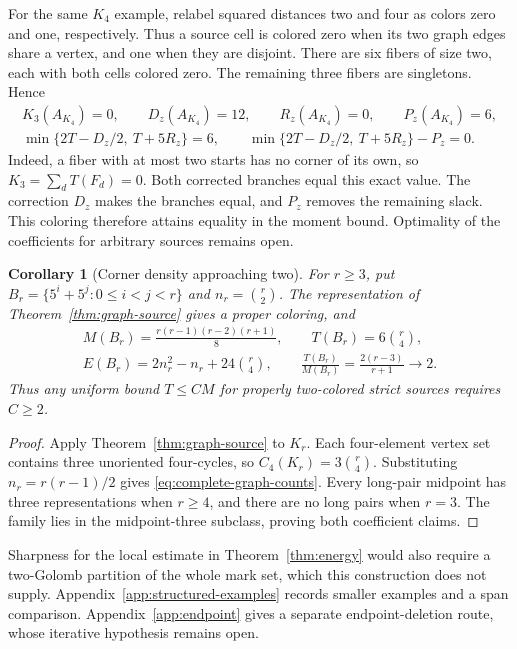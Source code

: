 \documentclass[11pt,a4paper]{article}
\newif\ifshowrevisions
\newenvironment{revision}{\par\begingroup\ifshowrevisions\color{red}\fi}{\par\endgroup}
\newtheorem{corollary}[theorem]{Corollary}
\theoremstyle{definition}
\numberwithin{equation}{section}
\begin{document}
\begin{revision}
For the same $K_4$ example, relabel squared distances two and four as
colors zero and one, respectively. Thus a source cell is colored zero
when its two graph edges share a vertex, and one when they are disjoint.
There are six fibers of size two, each with both cells colored zero.
The remaining three fibers are singletons. Hence
\begin{equation}\label{eq:k4-moment-sharpness}
\begin{gathered}
K_3(A_{K_4})=0,\qquad D_z(A_{K_4})=12,\qquad
R_z(A_{K_4})=0,\qquad P_z(A_{K_4})=6,\\
\min\{2T-D_z/2,\ T+5R_z\}=6,\qquad
\min\{2T-D_z/2,\ T+5R_z\}-P_z=0.
\end{gathered}
\end{equation}
Indeed, a fiber with at most two starts has no corner of its own, so
$K_3=\sum_dT(F_d)=0$. Both corrected branches equal this exact value.
The correction $D_z$ makes the branches equal, and $P_z$ removes the
remaining slack. This coloring therefore attains equality in the moment
bound. Optimality of the coefficients for arbitrary sources remains open.
\end{revision}

\begin{corollary}[Corner density approaching two]\label{prop:weight-two-family}
For $r\ge3$, put $B_r=\{5^i+5^j:0\le i<j<r\}$ and $n_r=\binom r2$. The representation of Theorem~\ref{thm:graph-source} gives a proper coloring, and
\begin{equation}\label{eq:complete-graph-counts}
\begin{gathered}
M(B_r)=\frac{r(r-1)(r-2)(r+1)}8,\qquad T(B_r)=6\binom r4,\\
E(B_r)=2n_r^2-n_r+24\binom r4,\qquad
\frac{T(B_r)}{M(B_r)}=\frac{2(r-3)}{r+1}\longrightarrow2.
\end{gathered}
\end{equation}
Thus any uniform bound $T\le CM$ for properly two-colored strict sources requires $C\ge2$.
\end{corollary}
\begin{proof}
Apply Theorem~\ref{thm:graph-source} to $K_r$. Each four-element vertex set contains three unoriented four-cycles, so $C_4(K_r)=3\binom r4$. Substituting $n_r=r(r-1)/2$ gives \eqref{eq:complete-graph-counts}. Every long-pair midpoint has three representations when $r\ge4$, and there are no long pairs when $r=3$. The family lies in the midpoint-three subclass, proving both coefficient claims.
\end{proof}
Sharpness for the local estimate in Theorem~\ref{thm:energy} would also require a two-Golomb partition of the whole mark set, which this construction does not supply. Appendix~\ref{app:structured-examples} records smaller examples and a span comparison. Appendix~\ref{app:endpoint} gives a separate endpoint-deletion route, whose iterative hypothesis remains open.
\end{document}
